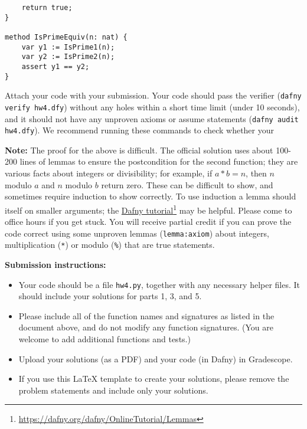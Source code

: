 \documentclass{article}
\newcommand{\visiblehref}[2]{\href{#1}{#2}\footnote{\url{#1}}}
\begin{document}
\begin{enumerate}
\begin{verbatim}
    return true;
}

method IsPrimeEquiv(n: nat) {
    var y1 := IsPrime1(n);
    var y2 := IsPrime2(n);
    assert y1 == y2;
}
\end{verbatim}

Attach your code with your submission.
Your code should pass the verifier (\texttt{dafny verify hw4.dfy}) without any holes
within a short time limit (under 10 seconds),
and it should not have any unproven axioms or assume statements (\texttt{dafny audit hw4.dfy}).
We recommend running these commands to check whether your

\textbf{Note:}
The proof for the above is difficult.
The official solution uses about 100-200 lines of lemmas
to ensure the postcondition for the second function;
they are various facts about integers or divisibility;
for example, if $a * b = n$, then $n$ modulo $a$ and $n$ modulo $b$ return zero.
These can be difficult to show, and sometimes require induction to show correctly.
To use induction a lemma should itself on smaller arguments; the \visiblehref{https://dafny.org/dafny/OnlineTutorial/Lemmas}{Dafny tutorial} may be helpful.
Please come to office hours if you get stuck.
You will receive partial credit if you can prove the code correct using some unproven lemmas (\texttt{lemma{:axiom}}) about integers, multiplication (\texttt{*}) or modulo (\texttt{\%}) that are true statements.

\end{enumerate}

\noindent
\textbf{Submission instructions:}
\begin{itemize}
\item Your code should be a file \texttt{hw4.py}, together with any necessary helper files.
It should include your solutions for parts 1, 3, and 5.
\item Please include all of the function names and signatures as listed in the document above,
and do not modify any function signatures. (You are welcome to add additional functions and tests.)
\item Upload your solutions (as a PDF) and your code (in Dafny) in Gradescope.
\item If you use this LaTeX template to create your solutions, please remove the problem statements and include only your solutions.
\end{itemize}
\end{document}
